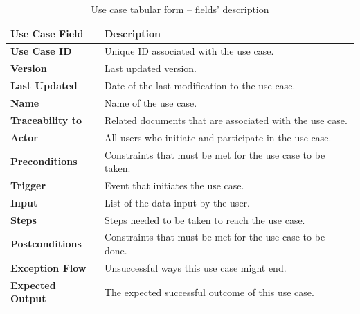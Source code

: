 \begin{justify}
\renewcommand{\arraystretch}{1.6}
\begin{table}[H]
\centering
\caption{Use case tabular form -- fields' description }
\begin{tabular}{!{\color{black}\vrule}l!{\color{black}\vrule}l!{\color{black}\vrule}} 
\hline
{} \textbf{Use Case Field}    & \textbf{Description}                                          \\ 
\hline
{}\textbf{Use Case ID}     & Unique
  ID associated with the use case.                     \\ 
\hline
{}\textbf{Version}         & Last
  updated version.                                       \\ 
\hline
{}\textbf{Last Updated}    & Date of
  the last modification to the use case.              \\ 
\hline
{}\textbf{Name}            & Name of
  the use case.                                       \\ 
\hline
{}\textbf{Traceability to} & Related
  documents that are associated with the use case.    \\ 
\hline
{}\textbf{Actor}           & All
  users who initiate and participate in the use case.     \\ 
\hline
{}\textbf{Preconditions}   & Constraints
  that must be met for the use case to be taken.  \\ 
\hline
{}\textbf{Trigger}         & Event
  that initiates the use case.                          \\ 
\hline
{}\textbf{Input}           & List of
  the data input by the user.                         \\ 
\hline
{}\textbf{Steps}           & Steps
  needed to be taken to reach the use case.             \\ 
\hline
{}\textbf{Postconditions}  & Constraints
  that must be met for the use case to be done.   \\ 
\hline
{}\textbf{Exception Flow}  & Unsuccessful
  ways this use case might end.                  \\ 
\hline
{}\textbf{Expected Output} & The
  expected successful outcome of this use case.           \\
\hline
\end{tabular}
\end{table}
\end{justify}


